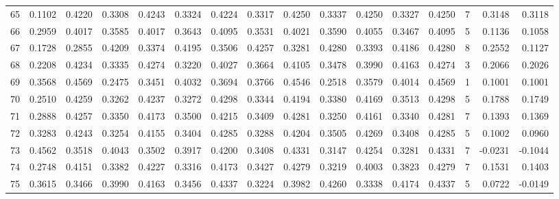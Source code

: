 \begin{tabular}{lrrrrrrrrrrrrrrr}
65  &      0.1102 &  0.4220 &  0.3308 &  0.4243 &  0.3324 &  0.4224 &  0.3317 &  0.4250 &  0.3337 &  0.4250 &   0.3327 &     0.4250 &      7 &                    0.3148 &                     0.3118 \\
66  &      0.2959 &  0.4017 &  0.3585 &  0.4017 &  0.3643 &  0.4095 &  0.3531 &  0.4021 &  0.3590 &  0.4055 &   0.3467 &     0.4095 &      5 &                    0.1136 &                     0.1058 \\
67  &      0.1728 &  0.2855 &  0.4209 &  0.3374 &  0.4195 &  0.3506 &  0.4257 &  0.3281 &  0.4280 &  0.3393 &   0.4186 &     0.4280 &      8 &                    0.2552 &                     0.1127 \\
68  &      0.2208 &  0.4234 &  0.3335 &  0.4274 &  0.3220 &  0.4027 &  0.3664 &  0.4105 &  0.3478 &  0.3990 &   0.4163 &     0.4274 &      3 &                    0.2066 &                     0.2026 \\
69  &      0.3568 &  0.4569 &  0.2475 &  0.3451 &  0.4032 &  0.3694 &  0.3766 &  0.4546 &  0.2518 &  0.3579 &   0.4014 &     0.4569 &      1 &                    0.1001 &                     0.1001 \\
70  &      0.2510 &  0.4259 &  0.3262 &  0.4237 &  0.3272 &  0.4298 &  0.3344 &  0.4194 &  0.3380 &  0.4169 &   0.3513 &     0.4298 &      5 &                    0.1788 &                     0.1749 \\
71  &      0.2888 &  0.4257 &  0.3350 &  0.4173 &  0.3500 &  0.4215 &  0.3409 &  0.4281 &  0.3250 &  0.4161 &   0.3340 &     0.4281 &      7 &                    0.1393 &                     0.1369 \\
72  &      0.3283 &  0.4243 &  0.3254 &  0.4155 &  0.3404 &  0.4285 &  0.3288 &  0.4204 &  0.3505 &  0.4269 &   0.3408 &     0.4285 &      5 &                    0.1002 &                     0.0960 \\
73  &      0.4562 &  0.3518 &  0.4043 &  0.3502 &  0.3917 &  0.4200 &  0.3408 &  0.4331 &  0.3147 &  0.4254 &   0.3281 &     0.4331 &      7 &                   -0.0231 &                    -0.1044 \\
74  &      0.2748 &  0.4151 &  0.3382 &  0.4227 &  0.3316 &  0.4173 &  0.3427 &  0.4279 &  0.3219 &  0.4003 &   0.3823 &     0.4279 &      7 &                    0.1531 &                     0.1403 \\
75  &      0.3615 &  0.3466 &  0.3990 &  0.4163 &  0.3456 &  0.4337 &  0.3224 &  0.3982 &  0.4260 &  0.3338 &   0.4174 &     0.4337 &      5 &                    0.0722 &                    -0.0149 \\

\end{tabular}
